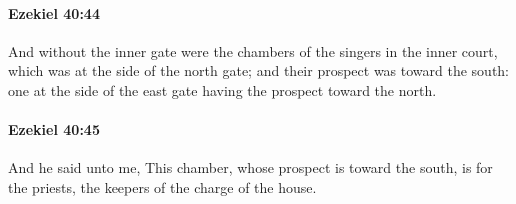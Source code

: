 		\paragraph{Ezekiel 40:44} %
			\label{EZEKIEL-40-44}

			And without the inner gate were the chambers of the singers in the inner court, which was at the side of the north gate; and their prospect was toward the south: one at the side of the east gate having the prospect toward the north.


		\paragraph{Ezekiel 40:45} %
			\label{EZEKIEL-40-45}

			And he said unto me, This chamber, whose prospect is toward the south, is for the priests, the keepers of the charge of the house.


